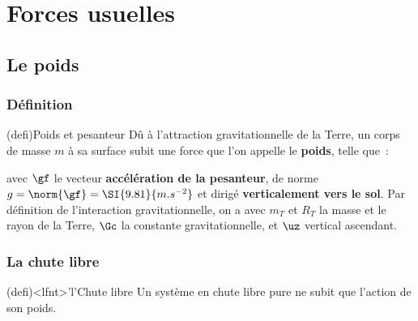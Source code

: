 \documentclass[../../main/main.tex]{subfiles}
\begin{document}
\section{Forces usuelles}
\subsection{Le poids}
\subsubsection{Définition}

\begin{tcb*}[sidebyside](defi){Poids et pesanteur}
	Dû à l'attraction gravitationnelle de la Terre, un corps de masse $m$ à sa
	surface subit une force que l'on appelle le \textbf{poids}, telle que~:
	\psw{
		\[\boxed{\Pf = m\gf = -mg\uz}\]
	}

	avec $\gf$ le vecteur \textbf{accélération de la pesanteur}, de norme $g =
		\norm{\gf} = \SI{9.81}{m.s^{-2}}$ et dirigé \textbf{verticalement vers le
		sol}.
	\tcblower
	Par définition de l'interaction gravitationnelle, on a
	\psw{
	\[\gf = -\Gc \frac{m_T}{R_T{}^2}\uz\]
	}
	avec $m_T$ et $R_T$ la masse et le rayon de la Terre, $\Gc$ la constante
	gravitationnelle, et $\uz$ vertical ascendant.
\end{tcb*}

\subsubsection{La chute libre}
\begin{tcb*}(defi)<lfnt>'l'{Chute libre}
	Un système en chute libre pure ne subit que l'action de son poids.
\end{tcb*}
\end{document}

